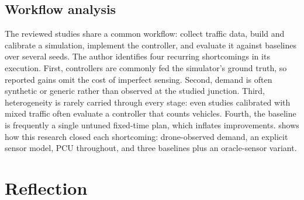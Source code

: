 \subsection{Workflow analysis}\label{sec:lit-workflow}
The reviewed studies share a common workflow: collect traffic data, build and calibrate a simulation,
implement the controller, and evaluate it against baselines over several seeds. The author identifies four
recurring shortcomings in its execution. First, controllers are commonly fed the simulator's ground truth, so
reported gains omit the cost of imperfect sensing. Second, demand is often synthetic or generic rather than
observed at the studied junction. Third, heterogeneity is rarely carried through every stage: even studies
calibrated with mixed traffic often evaluate a controller that counts vehicles. Fourth, the baseline is
frequently a single untuned fixed-time plan, which inflates improvements.  shows how this
research closed each shortcoming: drone-observed demand, an explicit sensor model, PCU throughout, and three
baselines plus an oracle-sensor variant.

\section{Reflection}\label{sec:lit-reflection}

